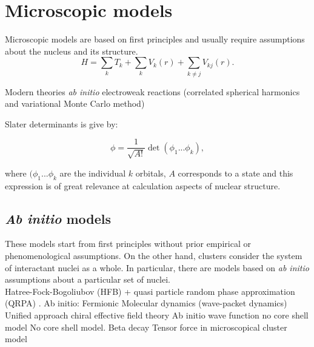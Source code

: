 \documentclass[openany]{book}
\begin{document}
\section{Microscopic models} \label{sec:microscopicalModels}

Microscopic models are based on first principles and usually require assumptions about the nucleus and its structure. \\ 

\begin{equation} \label{eq:micro_hamiltonian}
	H = \sum_{k} T_k + \sum_{k} V_k (r) + \sum_{k \neq j} V_{kj}(r).
\end{equation}

Modern theories \textit{ab initio} electroweak reactions  (correlated spherical harmonics and variational Monte Carlo method) \cite{marcucci_nollett_schiavilla_wiringa_2006}

Slater determinants is give by: 

\begin{equation} \label{eq:micro_slatter}
	\phi = \frac{1}{\sqrt{A!}} \det{(\phi_1 ... \phi_k)},
\end{equation}

where $(\phi_1 ... \phi_k$ are the individual $k$ orbitals, $A$ corresponds to a state and this expression is of great relevance at calculation aspects of nuclear structure.

\subsection{\textit{Ab initio} models} \label{sub:microscopical_abinitio}

These models start from first principles without prior empirical or phenomenological assumptions. 
On the other hand, clusters consider the system of interactant nuclei as a whole. In particular, there are models based on \textit{ab initio} assumptions about a particular set of nuclei.  \\
 
Hatree-Fock-Bogoliubov (HFB) + quasi particle random phase approximation (QRPA) \cite{chimanski_in_escher_peru_younes_2022}.
Ab initio: Fermionic Molecular dynamics (wave-packet dynamics) \cite{neff_feldmeier_langanke_2011}
Unified approach chiral effective field theory  \cite{navratil_quaglioni_hupin_romero-redondo_calci_2016}
Ab initio wave function no core shell model \cite{navratil_bertulani_caurier_2006}
No core shell model. Beta decay \cite{atkinson_navratil_hupin_kravvaris_quaglioni_2022}
Tensor force in microscopical cluster model \cite{arai_aoyama_suzuki_descouvemont_baye_2013}
\end{document}
